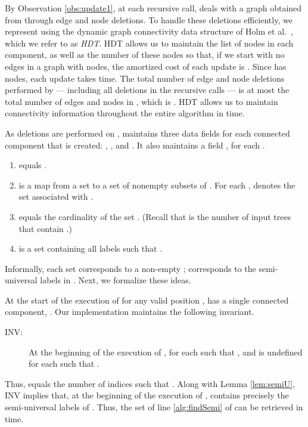 \documentclass[11pt]{article}
\theoremstyle{definition}
\begin{document}
By Observation \ref{obs:update1}, at each recursive call,  deals with a graph obtained from  through edge and node deletions.  To handle these deletions efficiently, we represent  using the dynamic graph connectivity data structure of  Holm et al.\ \cite{HolmLichtenbergThorup:2001}, which we refer to as \emph{HDT}.  HDT allows us to maintain the list of nodes in each component, as well as the number of these nodes so that, if we start with no edges in a graph with  nodes, the amortized cost of each update is .  Since  has  nodes, each update takes  time.  
The total number of edge and node deletions performed by  --- including all deletions in the recursive calls --- is at most the total number of edges and nodes in , which is .  HDT allows us to maintain connectivity information throughout the entire algorithm in  time.

As deletions are performed on ,  maintains three data fields for each connected component  that is created: , , and .  It also maintains a field , for each .  
\vspace{-0.1cm}
\begin{enumerate}
\vspace{-0.5\parskip}
 \itemsep1pt \parskip0pt 
\item
 equals .
\item
 is a map from a set  to a set of nonempty subsets of .  For each ,  denotes the set associated with .
\item
 equals the cardinality of the set
. (Recall that  is the number of input trees that contain .)
\item
 is a set containing all labels  such that .   
\end{enumerate}
\vspace{-0.1cm}
Informally, each set  corresponds to a non-empty ;  corresponds to the semi-universal labels in .  Next, we formalize these ideas.

At the start of the execution of  for any valid position ,  has a single connected component, .  Our implementation maintains the following invariant. 
\begin{description}\item[INV:]
At the beginning of the execution of ,  for each  such that , and  is undefined for each  such that .
\end{description}
Thus,  equals the number of indices  such that .  Along with Lemma \ref{lem:semiU}, INV implies that, at the beginning of the execution of ,  contains precisely the semi-universal labels of .
Thus, the set  of line \ref{alg:findSemi} of  can be retrieved in  time.
\end{document}
